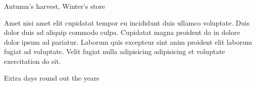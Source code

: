 {\mktsHOne{}\cjkgGlue{} Autumn’s harvest, Winter’s store\mktsHOneBeg}%


\vspace{\mktsLineheight}\begin{multicols}{2}\raggedcolumns{}Amet nisi amet elit cupidatat tempor eu incididunt duis ullamco voluptate. Duis dolor duis ad aliquip commodo culpa. Cupidatat magna proident do in dolore dolor ipsum ad pariatur. Laborum quis excepteur sint anim proident elit laborum fugiat ad voluptate. Velit fugiat nulla adipisicing adipisicing et voluptate exercitation do sit.



\end{multicols}


{\mktsHTwo{}\cjkgGlue{} Extra days round out the years\mktsHTwoBeg}%


